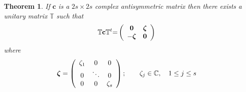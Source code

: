 \documentclass[aps,preprint]{revtex4}%
\newtheorem{theorem}{Theorem}
\begin{document}
\begin{theorem}
If $\mathbf{c}$ is a $2s\times2s$ complex antisymmetric matrix then there
exists a unitary matrix $\mathbb{T}$ such that
\begin{equation}
\mathbb{T}\mathbf{c}\mathbb{T}^{t}\mathbb{=}\left(
\begin{array}
[c]{cc}%
\mathbf{0} & \boldsymbol{\zeta}\\
-\boldsymbol{\zeta} & \mathbf{0}%
\end{array}
\right)
\end{equation}
where
\begin{equation}
\boldsymbol{\zeta}=\left(
\begin{array}
[c]{ccc}%
\zeta_{1} & 0 & 0\\
0 & \ddots & 0\\
0 & 0 & \zeta_{s}%
\end{array}
\right)  ;\qquad\zeta_{j}\in\mathbb{C},\quad1\leq j\leq s
\end{equation}



\end{theorem}
\end{document}
